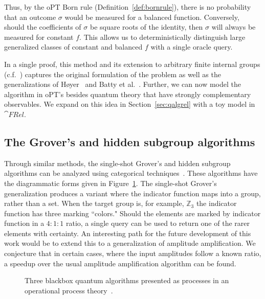 Thus, by the oPT Born rule (Definition~\ref{def:bornrule}), there is no probability that an outcome $\sigma$ would be measured for a balanced function.  Conversely, should the coefficients of $\sigma$ be square roots of the identity, then $\sigma$ will always be measured for constant $f$.  This allows us to deterministically distinguish large generalized classes of constant and balanced $f$ with a single oracle query.  

In a single proof, this method and its extension to arbitrary finite internal groups (c.f.~\cite{vicary-tqa}) captures the original formulation of the problem as well as the generalizations of H\o yer~\cite{hoyer1999conjugated} and Batty et al.~\cite{batty2006extending}. Further, we can now model the algorithm in oPT's besides quantum theory that have strongly complementary observables. We expand on this idea in Section~\ref{sec:qalgrel} with a toy model in $\cat{FRel}$. 

\subsection{The Grover's and hidden subgroup algorithms}
Through similar methods, the single-shot Grover's and hidden subgroup algorithms can be analyzed using categorical techniques~\cite{vicary-tqa}. These algorithms have the diagrammatic forms given in Figure~\ref{fig:algtriplet}. The single-shot Grover's generalization produces a variant where the indicator function maps into a group, rather than a set. When the target group is, for example, $\mathbb{Z}_3$ the indicator function has three marking ``colors." Should the elements are marked by indicator function in a $4:1:1$ ratio, a single query can be used to return one of the rarer elements with certainty. An interesting path for the future development of this work would be to extend this to a generalization of amplitude amplification. We conjecture that in certain cases, where the input amplitudes follow a known ratio, a speedup over the usual amplitude amplification algorithm can be found.

\begin{figure}[t]

\caption{Three blackbox quantum algorithms presented as processes in an operational process theory~\cite{vicary-tqa}.}
\label{fig:algtriplet}
\end{figure}


